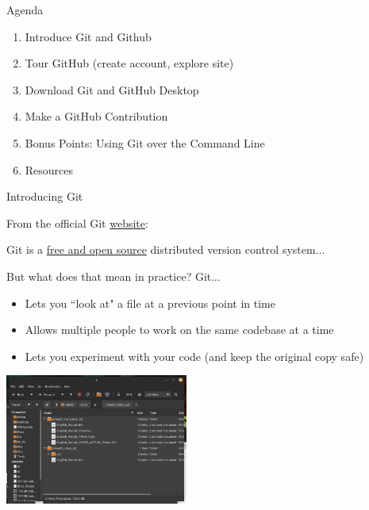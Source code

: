\documentclass{beamer}
\begin{document}
\begin{frame}{Agenda}
	\begin{enumerate}
		\item Introduce Git and Github
		\item Tour GitHub (create account, explore site)
		\item Download Git and GitHub Desktop
		\item Make a GitHub Contribution
		\item Bonus Points: Using Git over the Command Line
		\item Resources
	\end{enumerate}

\end{frame}


\begin{frame}{Introducing Git}

	From the official Git \href{https://git-scm.com}{website}: \newline

	\begin{displayquote}
		Git is a \href{https://git-scm.com/about/free-and-open-source}{free and open source} distributed version control system...
	\end{displayquote}

	{
	\small

	But what does that mean in practice? Git...

	\begin{itemize}
		\item Lets you ``look at" a file at a previous point in time
		\item Allows multiple people to work on the same codebase at a time
		\item Lets you experiment with your code (and keep the original copy safe)
	\end{itemize}
	}

	\href{https://raw.githubusercontent.com/ecc-cs-club/slides/main/1-Git-And-GitHub/assets/using-git.png}{
		\includegraphics[width=6cm]{using-git.png}
	}


\end{frame}
\end{document}
